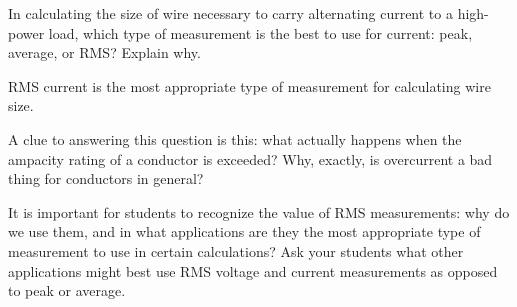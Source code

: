 

In calculating the size of wire necessary to carry alternating current to a high-power load, which type of measurement is the best to use for current: peak, average, or RMS?  Explain why.







RMS current is the most appropriate type of measurement for calculating wire size.







A clue to answering this question is this: what actually happens when the ampacity rating of a conductor is exceeded?  Why, exactly, is overcurrent a bad thing for conductors in general?

It is important for students to recognize the value of RMS measurements: why do we use them, and in what applications are they the most appropriate type of measurement to use in certain calculations?  Ask your students what other applications might best use RMS voltage and current measurements as opposed to peak or average.



